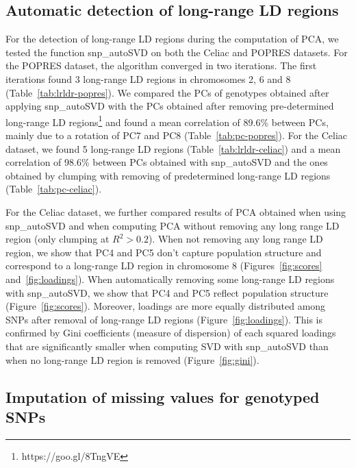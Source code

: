 \documentclass{bioinfo}
\begin{document}
\subsection{Automatic detection of long-range LD regions}

For the detection of long-range LD regions during the computation of PCA, we tested the function snp\_autoSVD on both the Celiac and POPRES datasets. For the POPRES dataset, the algorithm converged in two iterations. The first iterations found 3 long-range LD regions in chromosomes 2, 6 and 8 (Table~\ref{tab:lrldr-popres}). 
We compared the PCs of genotypes obtained after applying snp\_autoSVD with the PCs obtained after removing pre-determined long-range LD regions\footnote{https://goo.gl/8TngVE} and found a mean correlation of 89.6\% between PCs, mainly due to a rotation of PC7 and PC8 (Table~\ref{tab:pc-popres}). For the Celiac dataset, we found 5 long-range LD regions (Table~\ref{tab:lrldr-celiac}) and a mean correlation of 98.6\% between PCs obtained with snp\_autoSVD and the ones obtained by clumping with removing of predetermined long-range LD regions (Table~\ref{tab:pc-celiac}).

For the Celiac dataset, we further compared results of PCA obtained when using snp\_autoSVD and when computing PCA without removing any long range LD region (only clumping at $R^2 > 0.2$). 
When not removing any long range LD region, we show that PC4 and PC5 don't capture population structure and correspond to a long-range LD region in chromosome 8 (Figures~\ref{fig:scores} and~\ref{fig:loadings}). 
When automatically removing some long-range LD regions with snp\_autoSVD, we show that PC4 and PC5 reflect population structure (Figure~\ref{fig:scores}). Moreover, loadings are more equally distributed among SNPs after removal of long-range LD regions (Figure~\ref{fig:loadings}). 
This is confirmed by Gini coefficients (measure of dispersion) of each squared loadings that are significantly smaller when computing SVD with snp\_autoSVD than when no long-range LD region is removed (Figure~\ref{fig:gini}).

\subsection{Imputation of missing values for genotyped SNPs}\label{sec:impute}
\end{document}
